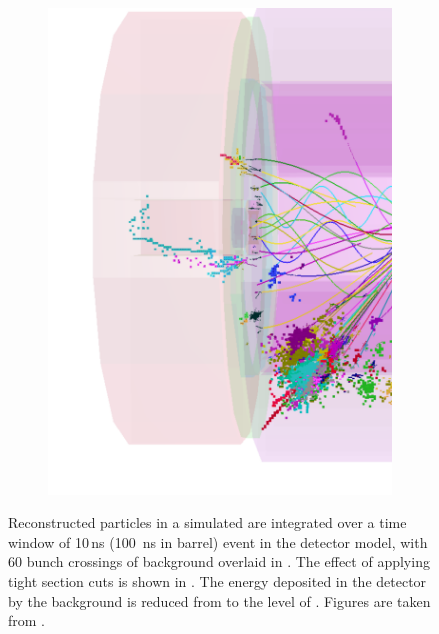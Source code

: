 \begin{figure}[tbph]
\begin{subfigure}[b]{0.45\textwidth}
    \includegraphics[width=\textwidth]{pandora/evtDisplayggHad2}
    \caption{}
    \label{fig:pandoraEvtDisplayggHad2}
  \end{subfigure}
\caption[Effect of the suppression of the background with the tight \PFO selection.]
{ Reconstructed particles  in a simulated \HepProcess{\Pep\Pem \to \PHiggs\PHiggs \to \Ptop\APbottom\Pbottom\APtop}  are integrated over a time window of 10\,ns (100 \,ns in \HCAL barrel) event in the \CLICILD detector model, with 60 bunch crossings of \ggHad background overlaid in . The effect of applying tight \PFO section cuts is shown in . The energy deposited in the detector by the background is reduced from  to the level of . Figures are taken from \cite{Marshall:2012ry}.}
\label{fig:pandoraEvtDisplayggHad}
\end{figure}

